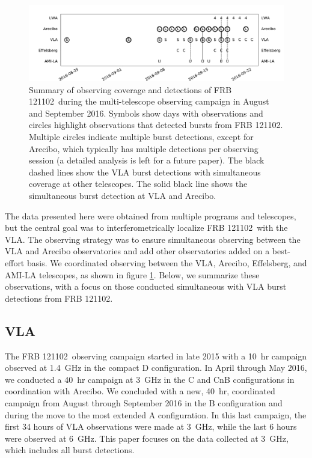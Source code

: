 \documentclass[twocolumn]{aastex61}
\newcommand{\frb}{FRB 121102}
\begin{document}
\begin{figure}[t]
\begin{center}
\includegraphics[width=2\columnwidth]{timeline}
\caption{Summary of observing coverage and detections of \frb\ during the multi-telescope observing campaign in August and September 2016. Symbols show days with observations and circles highlight observations that detected bursts from \frb. Multiple circles indicate multiple burst detections, except for Arecibo, which typically has multiple detections per observing session (a detailed analysis is left for a future paper). The black dashed lines show the VLA burst detections with simultaneous coverage at other telescopes. The solid black line shows the simultaneous burst detection at VLA and Arecibo.
\label{fig:multi}}
\end{center}
\end{figure}

The data presented here were obtained from multiple programs and telescopes, but the central goal was to interferometrically localize \frb\ with the VLA. The observing strategy was to ensure simultaneous observing between the VLA and Arecibo observatories and add other observatories added on a best-effort basis. We coordinated observing between the VLA, Arecibo, Effelsberg, and AMI-LA telescopes, as shown in figure \ref{fig:multi}. Below, we summarize these observations, with a focus on those conducted simultaneous with VLA burst detections from \frb.

\subsection{VLA}
The \frb\ observing campaign started in late 2015 with a 10~hr campaign observed at 1.4~GHz in the compact D configuration. In April through May 2016, we conducted a 40~hr campaign at 3~GHz in the C and CnB configurations in coordination with Arecibo. We concluded with a new, 40~hr, coordinated campaign from August through September 2016 in the B configuration and during the move to the most extended A configuration. In this last campaign, the first 34 hours of VLA observations were made at 3~GHz, while the last 6 hours were observed at 6~GHz. This paper focuses on the data collected at 3~GHz, which includes all burst detections.
\end{document}
